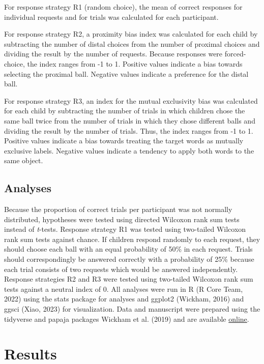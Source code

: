 \documentclass[
  man,floatsintext]{apa6}
\begin{document}
For response strategy R1 (random choice), the mean of correct responses for individual requests and for trials was calculated for each participant.

For response strategy R2, a proximity bias index was calculated for each child by subtracting the number of distal choices from the number of proximal choices and dividing the result by the number of requests. Because responses were forced-choice, the index ranges from -1 to 1. Positive values indicate a bias towards selecting the proximal ball. Negative values indicate a preference for the distal ball.

For response strategy R3, an index for the mutual exclusivity bias was calculated for each child by subtracting the number of trials in which children chose the same ball twice from the number of trials in which they chose different balls and dividing the result by the number of trials. Thus, the index ranges from -1 to 1. Positive values indicate a bias towards treating the target words as mutually exclusive labels. Negative values indicate a tendency to apply both words to the same object.

\subsection{Analyses}\label{analyses}

Because the proportion of correct trials per participant was not normally distributed, hypotheses were tested using directed Wilcoxon rank sum tests instead of \emph{t}-tests. Response strategy R1 was tested using two-tailed Wilcoxon rank sum tests against chance. If children respond randomly to each request, they should choose each ball with an equal probability of 50\% in each request. Trials should correspondingly be answered correctly with a probability of 25\% because each trial consists of two requests which would be answered independently. Response strategies R2 and R3 were tested using two-tailed Wilcoxon rank sum tests against a neutral index of 0. All analyses were run in R (R Core Team, 2022) using the stats package for analyses and ggplot2 (Wickham, 2016) and ggsci (Xiao, 2023) for visualization. Data and manuscript were prepared using the tidyverse and papaja packages Wickham et al. (2019) and are available \href{https://anonymous.4open.science/r/understanding_demonstratives-67C0/}{online}.

\section{Results}\label{results}
\end{document}
